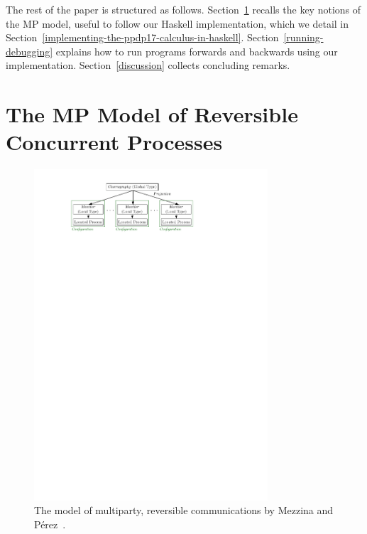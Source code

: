 \documentclass[runningheads,plain]{llncs}
\begin{document}
The rest of the paper is structured as follows.
Section~\ref{the-process-model} recalls the key notions of the MP model, useful to follow our Haskell implementation, which we detail 
in Section~\ref{implementing-the-ppdp17-calculus-in-haskell}.
Section~\ref{running-debugging} explains how to run programs forwards and backwards using our implementation.
Section~\ref{discussion} collects concluding remarks. 


\section{The MP Model of Reversible Concurrent Processes}
\label{the-process-model}

\begin{figure}[!t]
\begin{center}
    \includegraphics[width=8.7cm]{./img/figmodel.pdf}
\end{center}
\vspace{-8mm}
\caption{The model of multiparty, reversible communications by   Mezzina and P\'erez~\cite{DBLP:conf/ppdp/MezzinaP17}.}\label{f:model}
\vspace{-5mm}
\end{figure}
\end{document}
